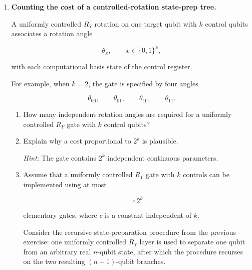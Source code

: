 \documentclass[11pt]{article}
\begin{document}
\begin{enumerate}[label=\textbf{Exercise \arabic*.}, leftmargin=2.2cm]
\begin{enumerate}[label=(\alph*)]
\begin{enumerate}[label=(\roman*)]
\end{enumerate}

\item Use the above method to determine
$\alpha$, $\beta_0$, and $\beta_1$ for

\[
|\phi\rangle
=
\frac12|00\rangle
+\frac12|01\rangle
+\frac1{\sqrt8}|10\rangle
+\sqrt{\frac38}|11\rangle .
\]

\item Explain how this construction suggests a recursive procedure
for preparing an arbitrary real $n$-qubit state.

\end{enumerate}

%
%

\item \textbf{Counting the cost of a controlled-rotation state-prep
tree.}

A uniformly controlled $R_Y$ rotation on one target qubit with
$k$ control qubits associates a rotation angle

\[
\theta_x,
\qquad
x\in\{0,1\}^k,
\]

with each computational basis state of the control register.

For example, when $k=2$, the gate is specified by four angles

\[
\theta_{00},\qquad
\theta_{01},\qquad
\theta_{10},\qquad
\theta_{11}.
\]

\begin{enumerate}[label=(\alph*)]

\item How many independent rotation angles are required for a
uniformly controlled $R_Y$ gate with $k$ control qubits?

\item Explain why a cost proportional to $2^k$ is plausible.

\textit{Hint:} The gate contains $2^k$ independent continuous
parameters.

\item Assume that a uniformly controlled $R_Y$ gate with $k$
controls can be implemented using at most

\[
c\,2^k
\]

elementary gates, where $c$ is a constant independent of $k$.

Consider the recursive state-preparation procedure from the previous
exercise: one uniformly controlled $R_Y$ layer is used to separate one
qubit from an arbitrary real $n$-qubit state, after which the procedure
recurses on the two resulting $(n-1)$-qubit branches.


\end{enumerate}
\end{enumerate}
\end{document}
